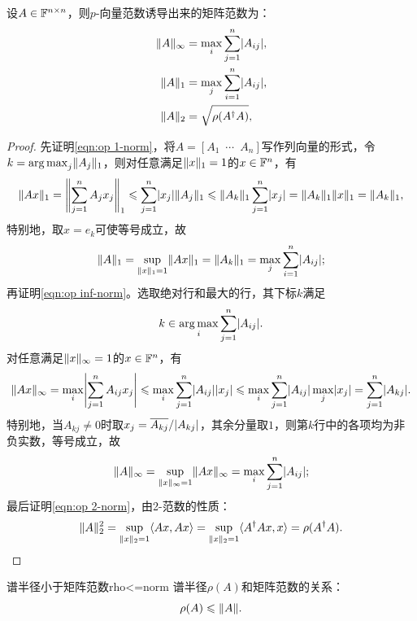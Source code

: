 \begin{example}
    {}{}
    设$A \in \mathbb{F}^{n\times n}$，则$p$-向量范数诱导出来的矩阵范数为：
    \begin{subequations}
        \label{eqn:op norm}
        \begin{align}
            \label{eqn:op inf-norm}
            \lVert A\rVert_\infty &= \max_{i}\sum_{j=1}^n\lvert A_{ij}\rvert,\\
            \label{eqn:op 1-norm}
            \lVert A\rVert_1 &= \max_{j}\sum_{i=1}^n\lvert A_{ij}\rvert,\\
            \label{eqn:op 2-norm}
            \lVert A\rVert_2 &= \sqrt{\rho(A^\dagger A)},
        \end{align}
    \end{subequations}
    \begin{proof}
        先证明\eqref{eqn:op 1-norm}，将$A = [A_1\enspace\cdots\enspace A_n]$写作列向量的形式，令$\textstyle k = \operatorname*{arg\,max}_j\lVert A_j\rVert_1$，则对任意满足$\lVert x\rVert_1 = 1$的$x \in \mathbb{F}^n$，有
        \[
            \lVert Ax\rVert_1 = \Biggl\lVert\sum_{j=1}^nA_jx_j\Biggr\rVert_1 \leqslant \sum_{j=1}^n\lvert x_j\rvert\lVert A_j\rVert_1 \leqslant \lVert A_k\rVert_1\sum_{j=1}^n\lvert x_j\rvert = \lVert A_k\rVert_1\lVert x\rVert_1 = \lVert A_k\rVert_1,
        \]
        特别地，取$x = e_k$可使等号成立，故
        \[
            \lVert A\rVert_1 = \sup_{\lVert x\rVert_1=1}\lVert Ax\rVert_1 = \lVert A_k\rVert_1 = \max_{j}\sum_{i=1}^n\lvert A_{ij}\rvert;
        \]
        再证明\eqref{eqn:op inf-norm}。选取绝对行和最大的行，其下标$k$满足
        \[
            k \in \operatorname*{arg\,max}_i\sum_{j=1}^n\lvert A_{ij}\rvert.
        \]
        对任意满足$\lVert x\rVert_\infty = 1$的$x \in \mathbb{F}^n$，有
        \[
            \lVert Ax\rVert_\infty = \max_i\Biggl\lvert\sum_{j=1}^nA_{ij}x_j\Biggr\rvert \leqslant \max_i\sum_{j=1}^n\lvert A_{ij}\rvert\lvert x_j\rvert \leqslant \max_i\sum_{j=1}^n\lvert A_{ij}\rvert\max_j\lvert x_j\rvert = \sum_{j=1}^n\lvert A_{kj}\rvert.
        \]
        特别地，当$A_{kj} \ne 0$时取$x_j = \overline{A_{kj}}/\lvert A_{kj}\rvert$，其余分量取$1$，则第$k$行中的各项均为非负实数，等号成立，故
        \[
            \lVert A\rVert_\infty = \sup_{\lVert x\rVert_\infty=1}\lVert Ax\rVert_\infty = \max_i\sum_{j=1}^n\lvert A_{ij}\rvert;
        \]
        最后证明\eqref{eqn:op 2-norm}，由2-范数的性质：
        \[
            \lVert A\rVert_2^2 = \sup_{\lVert x\rVert_2=1}\langle Ax,Ax\rangle = \sup_{\lVert x\rVert_2=1}\langle A^\dagger Ax,x\rangle = \rho(A^\dagger A).
            \qedhere
        \]
    \end{proof}
\end{example}

\begin{theorem}
    {谱半径小于矩阵范数}{rho<=norm}
    谱半径$\rho(A)$和矩阵范数的关系：
    \begin{equation}
        \label{eqn:rho<=norm}
        \rho(A) \leqslant \lVert A\rVert.
    \end{equation}
\end{theorem}

